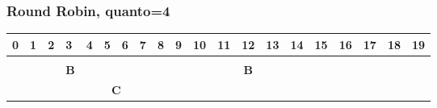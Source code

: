 \documentclass[a4paper]{article}
\begin{document}
\subsubsection{Round Robin, quanto=4}
\begin{table}[h!]
    \centering
    \label{my-label}
    \begin{tabular}{|l|l|l|l|l|l|l|l|l|l|l|l|l|l|l|l|l|l|l|l|}
        \hline
        0                                                        & 1 & 2 & 3                                                       & 4                                                       & 5 & 6                                                      & 7 & 8                                                       & 9 & 10                                                      & 11 & 12 & 13                                                     & 14 & 15                                             & 16 & 17                                                     & 18 & 19 \\ \hline
        \rowcolor[HTML]{FFFFFF}
        \multicolumn{3}{|c|}{\cellcolor[HTML]{656565}\textbf{A}} &   &   &                                                         &                                                         &   &                                                        &   &                                                         &   &                                                         &    &    &                                                        &    &                                                &    &                                                                  \\ \hline
        \rowcolor[HTML]{FFFFFF}
                                                                 &   &   & \multicolumn{1}{c|}{\cellcolor[HTML]{656565}\textbf{B}} &                                                         &   &                                                        &   &                                                         &   & \multicolumn{5}{c|}{\cellcolor[HTML]{656565}\textbf{B}} &    &    &                                                        &    &                                                                                                                        \\ \hline
        \rowcolor[HTML]{FFFFFF}
                                                                 &   &   &                                                         & \multicolumn{4}{c|}{\cellcolor[HTML]{656565}\textbf{C}} &   & \multicolumn{1}{c|}{\cellcolor[HTML]{FFFFFF}\textbf{}} &   & \multicolumn{1}{c|}{\cellcolor[HTML]{FFFFFF}\textbf{}}  &   &                                                         &    &    &                                                        &    &                                                &                                                                       \\ \hline

\end{tabular}
\end{table}
\end{document}
